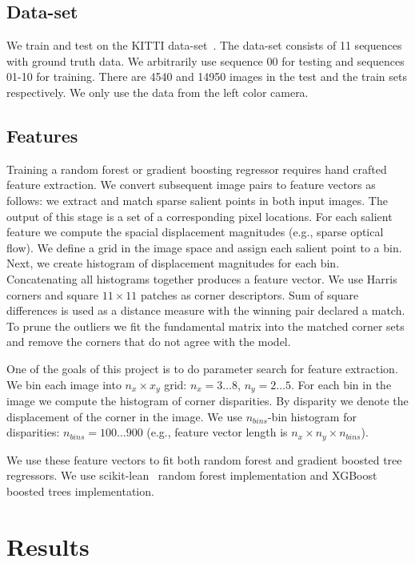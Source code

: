 \documentclass[twoside]{article}
\begin{document}
\subsection{Data-set}

We train and test on the KITTI data-set~\cite{geiger2013vision}.  The
data-set consists of 11 sequences with ground truth data.  We
arbitrarily use sequence 00 for testing and sequences 01-10 for
training.  There are 4540 and 14950 images in the test and the train
sets respectively. We only use the data from the left color camera.

\subsection{Features}\label{sec:features}

Training a random forest or gradient boosting regressor requires hand
crafted feature extraction.  We convert subsequent image pairs to
feature vectors as follows: we extract and match sparse salient points
in both input images.  The output of this stage is a set of a
corresponding pixel locations.  For each salient feature we compute
the spacial displacement magnitudes (e.g., sparse optical flow).  We
define a grid in the image space and assign each salient point to a
bin.  Next, we create histogram of displacement magnitudes for each
bin.  Concatenating all histograms together produces a feature
vector. We use Harris corners and square $11\times 11$ patches as
corner descriptors. Sum of square differences is used as a distance
measure with the winning pair declared a match.  To prune the outliers
we fit the fundamental matrix into the matched corner sets and remove
the corners that do not agree with the model.

One of the goals of this project is to do parameter search for feature
extraction. We bin each image into $n_x\times x_y$ grid:
$n_x=3\ldots 8$, $n_y=2\ldots 5$.  For each bin in the image we
compute the histogram of corner disparities.  By disparity we denote
the displacement of the corner in the image.  We use $n_{bins}$-bin
histogram for disparities: $n_{bins}=100\ldots 900$ (e.g., feature
vector length is $n_x \times n_y \times n_{bins}$).

We use these feature vectors to fit both random forest and gradient
boosted tree regressors.  We use scikit-lean~\cite{scikit-learn}
random forest implementation and XGBoost~\cite{2016arXiv160302754C}
boosted trees implementation.

\section{Results}
\end{document}
